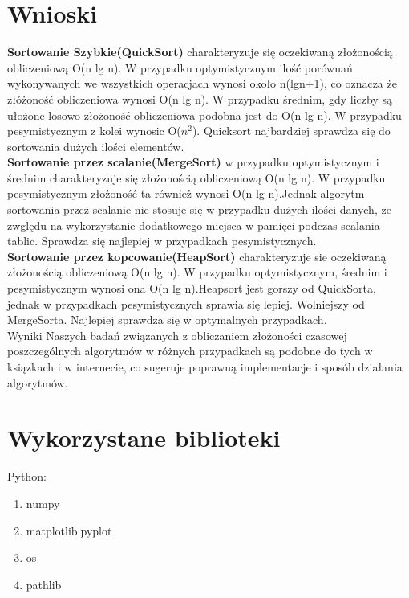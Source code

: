 \documentclass[12pt, polish]{article}
\begin{document}
\newpage
\section{Wnioski}
\textbf{Sortowanie Szybkie(QuickSort)} charakteryzuje się oczekiwaną złożonością obliczeniową O(n lg n). W przypadku optymistycznym ilość porównań wykonywanych we wszystkich operacjach wynosi około n(lgn+1), co oznacza że złóżoność obliczeniowa wynosi O(n lg n). W przypadku średnim, gdy liczby są ułożone losowo złożoność obliczeniowa podobna jest do O(n lg n). W przypadku pesymistycznym z kolei wynosic O($n^2$). Quicksort najbardziej sprawdza się do sortowania dużych ilości elementów.\\

\textbf{Sortowanie przez scalanie(MergeSort)} w przypadku optymistycznym i średnim charakteryzuje się złożonością obliczeniową O(n lg n). W przypadku pesymistycznym złożoność ta również wynosi O(n lg n).Jednak algorytm sortowania przez scalanie nie stosuje się w przypadku dużych ilości danych, ze zwględu na wykorzystanie dodatkowego miejsca w pamięci podczas scalania tablic. Sprawdza się najlepiej w przypadkach pesymistycznych.\\

\textbf{Sortowanie przez kopcowanie(HeapSort)} charakteryzuje sie oczekiwaną złożonością
obliczeniową O(n lg n). W przypadku optymistycznym, średnim i pesymistycznym wynosi ona O(n lg n).Heapsort jest gorszy od QuickSorta, jednak w przypadkach pesymistycznych sprawia się lepiej. Wolniejszy od MergeSorta. Najlepiej sprawdza się w optymalnych przypadkach.\\

Wyniki Naszych badań związanych z obliczaniem złożoności czasowej poszczególnych algorytmów w różnych przypadkach są podobne do tych w ksiązkach i w internecie, co sugeruje poprawną implementacje i sposób działania algorytmów.

\section{Wykorzystane biblioteki}
Python:
\begin{enumerate}
	\item numpy
	\item matplotlib.pyplot
	\item os
	\item pathlib
\end{enumerate}
\end{document}
